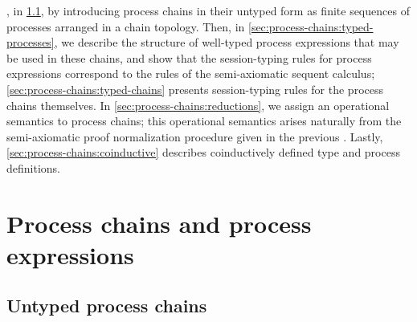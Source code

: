 , in \cref{sec:process-chains:untyped-chains}, by introducing process chains in their untyped form as finite sequences of processes arranged in a chain topology.
Then, in \cref{sec:process-chains:typed-processes}, we describe the structure of well-typed process expressions that may be used in these chains, and show that the session-typing rules for process expressions correspond to the rules of the semi-axiomatic sequent calculus;
\cref{sec:process-chains:typed-chains} presents session-typing rules for the process chains themselves.
In \cref{sec:process-chains:reductions}, we assign an operational semantics to process chains; this operational semantics arises naturally from the semi-axiomatic proof normalization procedure given in the previous .
Lastly, \cref{sec:process-chains:coinductive} describes coinductively defined type and process definitions.


\section{Process chains and process expressions}\label{sec:process-chains:interpretation}

\subsection{Untyped process chains}\label{sec:process-chains:untyped-chains}

